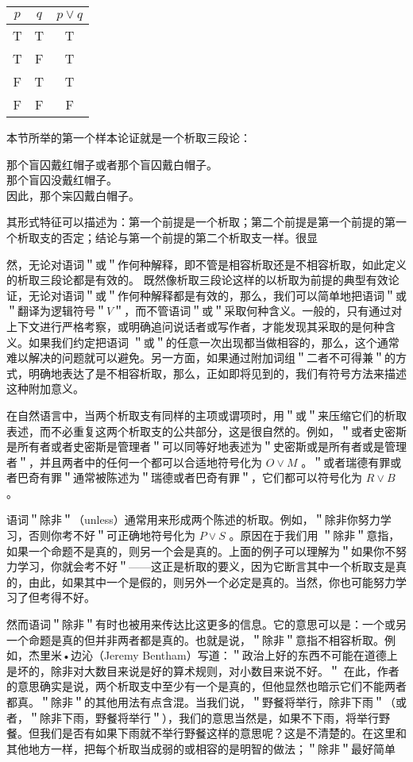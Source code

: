 \begin{center}
\begin{tabular}{|ccc|}
\hline
$p$ & $q$ & $p \vee q$ \\
\hline
T & T & T \\
T & F & T \\
F & T & T \\
F & F & F \\
\hline
\end{tabular}
\end{center}

本节所举的第一个样本论证就是一个析取三段论\cite{boole1854}：

那个盲囚戴红帽子或者那个盲囚戴白帽子。\\
那个盲囚没戴红帽子。\\
因此，那个杗囚戴白帽子。

其形式特征可以描述为：第一个前提是一个析取；第二个前提是第一个前提的第一个析取支的否定；结论与第一个前提的第二个析取支一样。很显

然，无论对语词＂或＂作何种解释，即不管是相容析取还是不相容析取，如此定义的析取三段论都是有效的。\cite{russell1903} 既然像析取三段论这样的以析取为前提的典型有效论证，无论对语词＂或＂作何种解释都是有效的，那么，我们可以简单地把语词＂或＂翻译为逻辑符号＂$V$＂，而不管语词＂或＂采取何种含义。一般的，只有通过对上下文进行严格考察，或明确追问说话者或写作者，才能发现其采取的是何种含义。如果我们约定把语词 ＂或＂的任意一次出现都当做相容的，那么，这个通常难以解决的问题就可以避免。另一方面，如果通过附加词组＂二者不可得兼＂的方式，明确地表达了是不相容析取，那么，正如即将见到的，我们有符号方法来描述这种附加意义。

在自然语言中，当两个析取支有同样的主项或谓项时，用＂或＂来压缩它们的析取表述，而不必重复这两个析取支的公共部分，这是很自然的。例如，＂或者史密斯是所有者或者史密斯是管理者＂可以同等好地表述为＂史密斯或是所有者或是管理者＂，并且两者中的任何一个都可以合适地符号化为 $O \vee M$ 。＂或者瑞德有罪或者巴奇有罪＂通常被陈述为＂瑞德或者巴奇有罪＂，它们都可以符号化为 $R \vee B$ 。

语词＂除非＂（unless）通常用来形成两个陈述的析取。例如，＂除非你努力学习，否则你考不好＂可正确地符号化为 $P \vee S$ 。原因在于我们用 ＂除非＂意指，如果一个命题不是真的，则另一个会是真的。上面的例子可以理解为＂如果你不努力学习，你就会考不好＂——这正是析取的要义，因为它断言其中一个析取支是真的，由此，如果其中一个是假的，则另外一个必定是真的。当然，你也可能努力学习了但考得不好。

然而语词＂除非＂有时也被用来传达比这更多的信息。它的意思可以是：一个或另一个命题是真的但并非两者都是真的。也就是说，＂除非＂意指不相容析取。例如，杰里米•边沁（Jeremy Bentham）写道：＂政治上好的东西不可能在道德上是坏的，除非对大数目来说是好的算术规则，对小数目来说不好。＂\cite{hume1748} 在此，作者的意思确实是说，两个析取支中至少有一个是真的，但他显然也暗示它们不能两者都真。＂除非＂的其他用法有点含混。当我们说，＂野餐将举行，除非下雨＂（或者，＂除非下雨，野餐将举行＂），我们的意思当然是，如果不下雨，将举行野餐。但我们是否有如果下雨就不举行野餐这样的意思呢？这是不清楚的。在这里和其他地方一样，把每个析取当成弱的或相容的是明智的做法；＂除非＂最好简单

